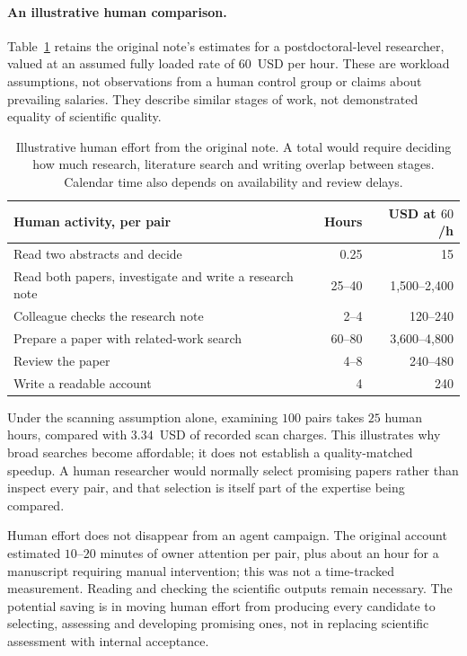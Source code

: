 \documentclass[11pt,a4paper]{article}
\begin{document}
\paragraph{An illustrative human comparison.}
Table~\ref{tab:human-resources} retains the original note's estimates for a
postdoctoral-level researcher, valued at an assumed fully loaded rate of
$60$~USD per hour. These are workload assumptions, not observations from a
human control group or claims about prevailing salaries. They describe similar
stages of work, not demonstrated equality of scientific quality.

\begin{table}[htbp]
\centering
\small
\begin{tabularx}{\linewidth}{@{}Xrr@{}}
\toprule
Human activity, per pair & Hours & USD at $60$/h \\
\midrule
Read two abstracts and decide & 0.25 & 15 \\
Read both papers, investigate and write a research note & 25--40 & 1,500--2,400 \\
Colleague checks the research note & 2--4 & 120--240 \\
Prepare a paper with related-work search & 60--80 & 3,600--4,800 \\
Review the paper & 4--8 & 240--480 \\
Write a readable account & 4 & 240 \\
\bottomrule
\end{tabularx}
\caption{Illustrative human effort from the original note. A total would
require deciding how much research, literature search and writing overlap
between stages. Calendar time also depends on availability and review delays.}
\label{tab:human-resources}
\end{table}

Under the scanning assumption alone, examining $100$ pairs takes $25$ human
hours, compared with $3.34$~USD of recorded scan charges. This illustrates
why broad searches become affordable; it does not establish a quality-matched
speedup. A human researcher would normally select promising papers rather
than inspect every pair, and that selection is itself part of the expertise
being compared.

Human effort does not disappear from an agent campaign. The original account
estimated $10$--$20$ minutes of owner attention per pair, plus about an hour
for a manuscript requiring manual intervention; this was not a time-tracked
measurement. Reading and checking the scientific outputs remain necessary.
The potential saving is in moving human effort from producing every candidate
to selecting, assessing and developing promising ones, not in replacing
scientific assessment with internal acceptance.
\end{document}
